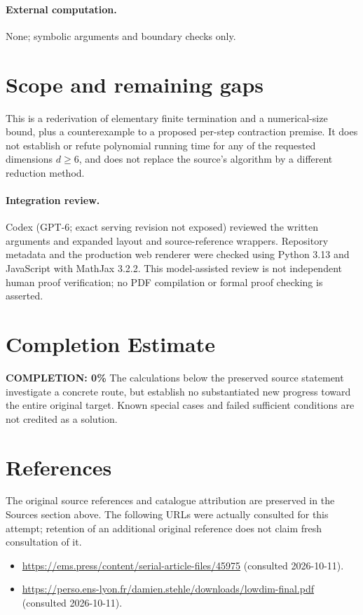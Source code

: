 \documentclass[11pt]{article}
\begin{document}
\paragraph{External computation.} None; symbolic arguments and boundary checks only.
\section{Scope and remaining gaps}
This is a rederivation of elementary finite termination and a numerical-size bound, plus a counterexample to a proposed per-step contraction premise. It does not establish or refute polynomial running time for any of the requested dimensions $d\geq6$, and does not replace the source's algorithm by a different reduction method.
\paragraph{Integration review.} Codex (GPT-6; exact serving revision not exposed) reviewed the written arguments and expanded layout and source-reference wrappers. Repository metadata and the production web renderer were checked using Python 3.13 and JavaScript with MathJax 3.2.2. This model-assisted review is not independent human proof verification; no PDF compilation or formal proof checking is asserted.

\section{Completion Estimate}
\noindent\textbf{COMPLETION: 0\%}
The calculations below the preserved source statement investigate a concrete route,
but establish no substantiated new progress toward the entire original target.
Known special cases and failed sufficient conditions are not credited as a solution.
\section{References}
The original source references and catalogue attribution are preserved in the
Sources section above. The following URLs were actually consulted for this attempt;
retention of an additional original reference does not claim fresh consultation of it.
\begin{itemize}
\item \url{https://ems.press/content/serial-article-files/45975} (consulted 2026-10-11). 
\item \url{https://perso.ens-lyon.fr/damien.stehle/downloads/lowdim-final.pdf} (consulted 2026-10-11). 
\end{itemize}
\end{document}
